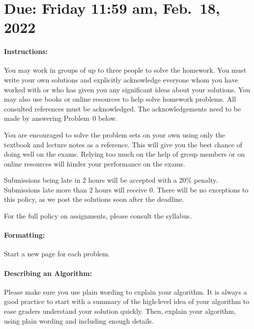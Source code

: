 \documentclass[11pt]{article}
\begin{document}
\maketitle

\section*{Due: Friday 11:59 am, Feb.\ 18, 2022}

\paragraph*{Instructions:}

You may work in groups of up to three people to solve the homework.
You must write your own solutions and explicitly acknowledge everyone whom 
you have worked with or who has given you any significant ideas about your solutions. 
You may also use books or online resources to help solve homework problems.  
All consulted references must be acknowledged. The acknowledgements need to be made by answering Problem~0 below.

You are encouraged to solve the problem sets on your own using only the textbook and lecture notes as a reference. This will give you the best chance of doing well on the exams. Relying too much on the help of group members or on online resources will hinder your performance on the exams.

Submissions being late in 2 hours will be accepted with a 20\% penalty. Submissions late more than 2 hours will receive 0. There will be no exceptions to this policy, as we post the solutions soon after the deadline. 

For the full policy on assignments, please consult the syllabus.

\paragraph*{Formatting:} Start a new page for each problem.

\paragraph*{Describing an Algorithm:} Please make sure you use plain wording to explain your algorithm. It is always a good practice to start with a summary of the high-level idea of your algorithm to ease graders understand your solution quickly. Then, explain your algorithm, using plain wording and including enough details.
\end{document}
